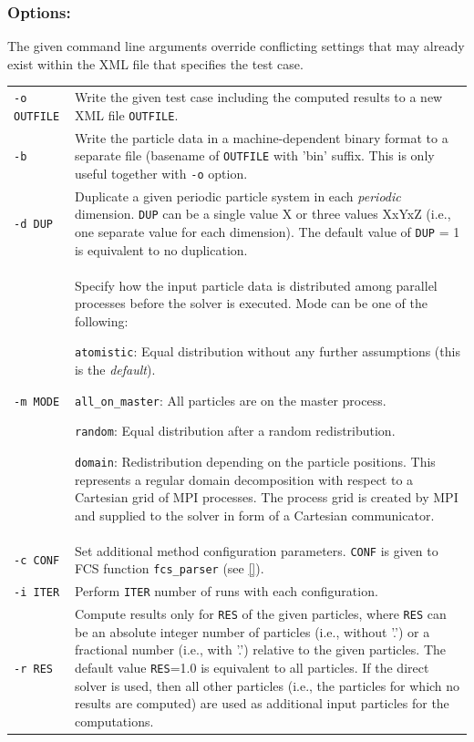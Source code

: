 \subsubsection*{Options:}

\noindent
The given command line arguments override conflicting settings that may already exist within the XML file that specifies the test case.

\begin{tabular}{lp{}}

\texttt{-o OUTFILE} &
Write the given test case including the computed results to a new XML file \texttt{OUTFILE}.
\\
\texttt{-b} &
Write the particle data in a machine-dependent binary format to a separate file (basename of \texttt{OUTFILE} with 'bin' suffix.
This is only useful together with \texttt{-o} option.
\\
\texttt{-d DUP} &
Duplicate a given periodic particle system in each \emph{periodic} dimension.
\texttt{DUP} can be a single value X or three values XxYxZ (i.e., one separate value for each dimension).
The default value of \texttt{DUP} = 1 is equivalent to no duplication.
\\
\texttt{-m MODE} &
Specify how the input particle data is distributed among parallel processes before the solver is executed.
Mode can be one of the following:
\begin{compactitem}
  \item \texttt{atomistic}: Equal distribution without any further assumptions (this is the \emph{default}).
  \item \texttt{all\_on\_master}: All particles are on the master process.
  \item \texttt{random}: Equal distribution after a random redistribution.
  \item \texttt{domain}: Redistribution depending on the particle positions.
This represents a regular domain decomposition with respect to a Cartesian grid of MPI processes.
The process grid is created by MPI and supplied to the solver in form of a Cartesian communicator.
\end{compactitem}
\\
\texttt{-c CONF} & Set additional method configuration parameters. \texttt{CONF} is given to FCS function \texttt{fcs\_parser} (see \ref{}).
\\
\texttt{-i ITER} & Perform \texttt{ITER} number of runs with each configuration.
\\
\texttt{-r RES} &
Compute results only for \texttt{RES} of the given particles, where \texttt{RES} can be an absolute integer number of particles (i.e., without '.') or a fractional number (i.e., with '.') relative to the given particles.
The default value \texttt{RES}=1.0 is equivalent to all particles.
If the direct solver is used, then all other particles (i.e., the particles for which no results are computed) are used as additional input particles for the computations.
\end{tabular}


